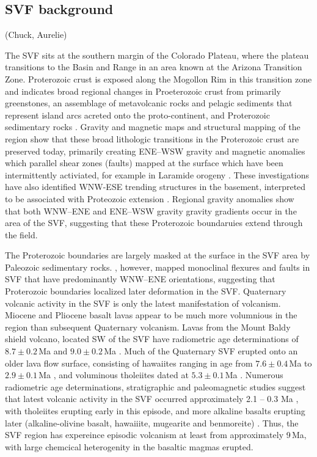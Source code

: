 \documentclass[draft,jgrga]{agutex}
\begin{document}
\begin{article}
\section{SVF background} (Chuck, Aurelie)

The SVF sits at the southern margin of the Colorado Plateau, where the plateau transitions to the Basin and Range in an area known at the Arizona Transition Zone. Proterozoic crust is exposed along the Mogollon Rim in this transition zone and indicates broad regional changes in Proeterozoic crust from primarily greenstones, an assemblage of metavolcanic rocks and pelagic sediments that represent island arcs acreted onto the proto-continent, and Proterozoic sedimentary rocks \citep{Gilbert2007}. Gravity and magnetic maps and structural mapping of the region show that these broad lithologic transitions in the Proterozoic crust are preserved today, primarily creating ENE--WSW gravity and magnetic anomalies which parallel shear zones (faults) mapped at the surface which have been intermittently activiated, for example in Laramide orogeny \citep{Shoemaker1978, Seeley2003}. These investigations have also identified WNW-ESE trending structures in the basement, interpreted to be associated with Proteozoic extension \citep{Seeley2003}. Regional gravity anomalies show that both WNW--ENE and ENE--WSW gravity gravity gradients occur in the area of the SVF, suggesting that these Proterozoic boundaruies extend through the field.

The Proterozoic boundaries are largely masked at the surface in the SVF area by Paleozoic sedimentary rocks. \citet{Crumpler1994}, however, mapped monoclinal flexures and faults in SVF that have predominantly WNW--ENE orientations, suggesting that Proterozoic boundaries localized later deformation in the SVF. Quaternary volcanic activity in the SVF is only the latest manifestation of volcanism. Miocene and Pliocene basalt lavas appear to be much more volumnious in the region than subsequent Quaternary volcanism. Lavas from the Mount Baldy shield volcano, located SW of the SVF have radiometric age determinations of $8.7 \pm 0.2$\,Ma and $9.0 \pm 0.2$\,Ma \citep{Condit1984, Condit1985, Nealey1989}. Much of the Quaternary SVF erupted onto an older lava flow surface, consisting of hawaiites ranging in age from $7.6 \pm 0.4$\,Ma to $2.9 \pm 0.1$\,Ma \citep{Laughlin1979, Condit1996}, and voluminous tholeiites dated at $5.3 \pm 0.1$\,Ma \citep{Cooper1990}. Numerous radiometric age determinations, stratigraphic and paleomagnetic studies suggest that latest volcanic activity in the SVF occurred approximately 2.1 -- 0.3 Ma \citep{Cooper1990, Pierce1979, Condit1985, Aubele1986}, with tholeiites erupting early in this episode, and more alkaline basalts erupting later (alkaline-olivine basalt, hawaiiite, mugearite and benmoreite) \citep{Condit1996}. Thus, the SVF region has expereince episodic volcanism at least from approximately 9\,Ma, with large chemcical heterogenity in the basaltic magmas erupted.


\end{article}
\end{document}
